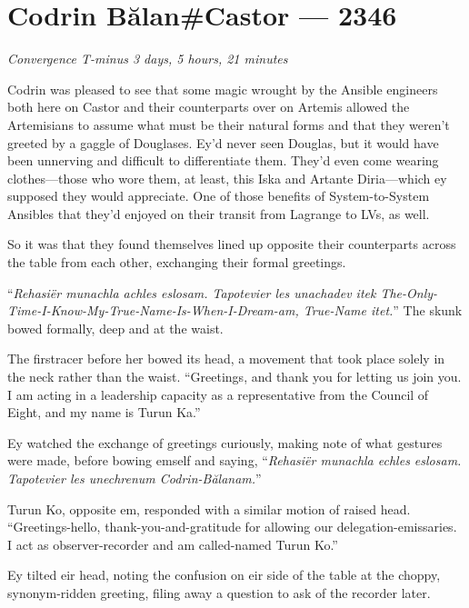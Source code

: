 \hypertarget{codrin-bux103lancastor-2346}{%
\chapter{Codrin Bălan\#Castor — 2346}}

\begin{center}
\emph{Convergence T-minus 3 days, 5 hours, 21 minutes}
\end{center}

\noindent Codrin was pleased to see that some magic wrought by the Ansible engineers both here on Castor and their counterparts over on Artemis allowed the Artemisians to assume what must be their natural forms and that they weren't greeted by a gaggle of Douglases. Ey'd never seen Douglas, but it would have been unnerving and difficult to differentiate them. They'd even come wearing clothes—those who wore them, at least, this Iska and Artante Diria—which ey supposed they would appreciate. One of those benefits of System-to-System Ansibles that they'd enjoyed on their transit from Lagrange to LVs, as well.

So it was that they found themselves lined up opposite their counterparts across the table from each other, exchanging their formal greetings.

``\emph{Rehasiër munachla achles eslosam. Tapotevier les unachadev itek The-Only-Time-I-Know-My-True-Name-Is-When-I-Dream-am, True-Name itet.}'' The skunk bowed formally, deep and at the waist.

The firstracer before her bowed its head, a movement that took place solely in the neck rather than the waist. ``Greetings, and thank you for letting us join you. I am acting in a leadership capacity as a representative from the Council of Eight, and my name is Turun Ka.''

Ey watched the exchange of greetings curiously, making note of what gestures were made, before bowing emself and saying, ``\emph{Rehasiër munachla echles eslosam. Tapotevier les unechrenum Codrin-Bălanam.}''

Turun Ko, opposite em, responded with a similar motion of raised head. ``Greetings-hello, thank-you-and-gratitude for allowing our delegation-emissaries. I act as observer-recorder and am called-named Turun Ko.''

Ey tilted eir head, noting the confusion on eir side of the table at the choppy, synonym-ridden greeting, filing away a question to ask of the recorder later.

